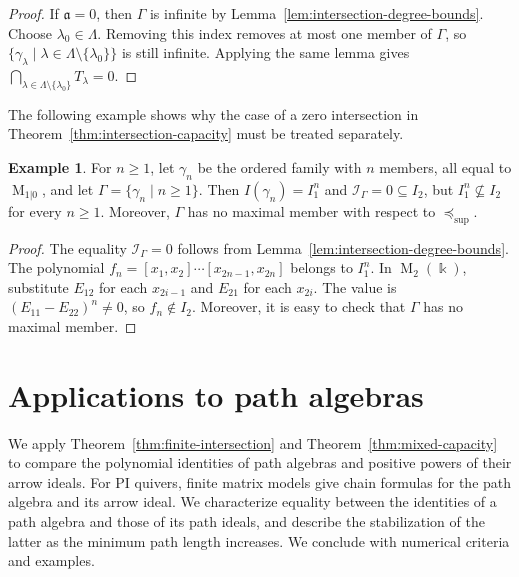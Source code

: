 \documentclass[11pt,reqno]{amsart}
\newcommand{\kk}{\Bbbk}
\newcommand{\Mat}{\operatorname{M}}
\theoremstyle{definition}
\newtheorem{example}[theorem]{Example}
\theoremstyle{remark}
\numberwithin{equation}{section}
\begin{document}
\begin{proof}
If $\mathfrak a=0$, then $\Gamma$ is infinite by
Lemma~\ref{lem:intersection-degree-bounds}.
Choose $\lambda_0\in\Lambda$.
Removing this index removes at most one member of
$\Gamma$, so
$\{\gamma_\lambda\mid
\lambda\in\Lambda\setminus\{\lambda_0\}\}$
is still infinite.
Applying the same lemma gives
$\bigcap_{\lambda\in\Lambda\setminus\{\lambda_0\}}
T_\lambda=0$.

\end{proof}

The following example shows why the case of a zero intersection in
Theorem~\ref{thm:intersection-capacity} must be treated
separately.

\begin{example}\label{ex:infinite-intersection-zero}
For $n\geq1$, let $\gamma_n$ be the ordered family
with $n$ members, all equal to $\Mat_{1|0}$, and let
$\Gamma=\{\gamma_n\mid n\geq1\}$.
Then $I(\gamma_n)=I_1^n$ and
$\mathcal I_\Gamma=0\subseteq I_2$, but
$I_1^n\nsubseteq I_2$ for every $n\geq1$.
Moreover, $\Gamma$ has no maximal member with respect
to $\preceq_{\mathrm{sup}}$.
\end{example}

\begin{proof}
The equality $\mathcal I_\Gamma=0$ follows from
Lemma~\ref{lem:intersection-degree-bounds}.
The polynomial
$f_n=[x_1,x_2]\cdots[x_{2n-1},x_{2n}]$
belongs to $I_1^n$.
In $\Mat_2(\kk)$, substitute $E_{12}$ for each
$x_{2i-1}$ and $E_{21}$ for each $x_{2i}$.
The value is $(E_{11}-E_{22})^n\ne0$, so
$f_n\notin I_2$.
Moreover, it is easy to check that $\Gamma$ has no maximal member.
\end{proof}







\section{Applications to path algebras}\label{sec:path-applications}

We apply Theorem~\ref{thm:finite-intersection} and Theorem~\ref{thm:mixed-capacity}
 to 
compare the polynomial
identities of path algebras and positive powers of their
arrow ideals.
 For PI quivers, finite matrix models
give chain formulas for the path algebra and its arrow ideal.
We characterize equality between the identities of a path
algebra and those of its path ideals, and describe the
stabilization of the latter as the minimum path length
increases. We conclude with numerical criteria and examples.
\end{document}
